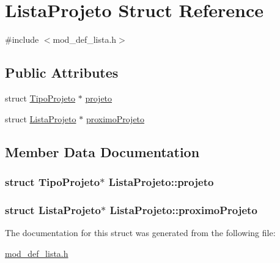 \hypertarget{structListaProjeto}{\section{Lista\+Projeto Struct Reference}
\label{structListaProjeto}
}


{\ttfamily \#include $<$mod\+\_\+def\+\_\+lista.\+h$>$}

\subsection*{Public Attributes}
\begin{DoxyCompactItemize}
\item 
struct \hyperlink{structTipoProjeto}{Tipo\+Projeto} $\ast$ \hyperlink{structListaProjeto_a94a2bcd0fee6c6fe87f821cc40437251}{projeto}
\item 
struct \hyperlink{structListaProjeto}{Lista\+Projeto} $\ast$ \hyperlink{structListaProjeto_a22fa64a88ea5e5a69de6b67141a71a5e}{proximo\+Projeto}
\end{DoxyCompactItemize}


\subsection{Member Data Documentation}
\hypertarget{structListaProjeto_a94a2bcd0fee6c6fe87f821cc40437251}{
\subsubsection[{projeto}]{\setlength{\rightskip}{0pt plus 5cm}struct {\bf Tipo\+Projeto}$\ast$ Lista\+Projeto\+::projeto}}\label{structListaProjeto_a94a2bcd0fee6c6fe87f821cc40437251}
\hypertarget{structListaProjeto_a22fa64a88ea5e5a69de6b67141a71a5e}{
\subsubsection[{proximo\+Projeto}]{\setlength{\rightskip}{0pt plus 5cm}struct {\bf Lista\+Projeto}$\ast$ Lista\+Projeto\+::proximo\+Projeto}}\label{structListaProjeto_a22fa64a88ea5e5a69de6b67141a71a5e}


The documentation for this struct was generated from the following file\+:\begin{DoxyCompactItemize}
\item 
\hyperlink{mod__def__lista_8h}{mod\+\_\+def\+\_\+lista.\+h}\end{DoxyCompactItemize}
